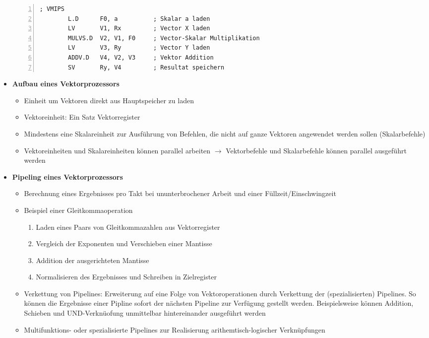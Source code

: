 \begin{itemize}
\begin{minipage}{\linewidth}
\begin{lstlisting}[frame=single,numbers=left,mathescape,language={[mips]Assembler},tabsize=4]
; VMIPS
		L.D      F0, a       	; Skalar a laden
		LV       V1, Rx      	; Vector X laden
		MULVS.D  V2, V1, F0  	; Vector-Skalar Multiplikation
		LV       V3, Ry      	; Vector Y laden
		ADDV.D   V4, V2, V3  	; Vektor Addition
		SV       Ry, V4      	; Resultat speichern
	\end{lstlisting}
	\end{minipage}
	\item \textbf{Aufbau eines Vektorprozessors}
	\begin{itemize}
		\item Einheit um Vektoren direkt aus Hauptspeicher zu laden
		\item Vektoreinheit: Ein Satz Vektorregister
		\item Mindestens eine Skalareinheit zur Ausführung von Befehlen, die nicht auf ganze Vektoren angewendet werden sollen (Skalarbefehle)
		\item Vektoreinheiten und Skalareinheiten können parallel arbeiten \(\rightarrow\) Vektorbefehle und Skalarbefehle können parallel ausgeführt werden
	\end{itemize}
	\item \textbf{Pipeling eines Vektorprozessors}
	\begin{itemize}
		\item Berechnung eines Ergebnisses pro Takt bei ununterbrochener Arbeit und einer Füllzeit/Einschwingzeit
		\item Beispiel einer Gleitkommaoperation
		\begin{enumerate}
			\item Laden eines Paars von Gleitkommazahlen aus Vektorregister
			\item Vergleich der Exponenten und Verschieben einer Mantisse
			\item Addition der ausgerichteten Mantisse
			\item Normalisieren des Ergebnisses und Schreiben in Zielregister
		\end{enumerate}
		\item Verkettung von Pipelines: Erweiterung auf eine Folge von Vektoroperationen durch Verkettung der (spezialisierten) Pipelines. So können die Ergebnisse einer Pipline sofort der nächsten Pipeline zur Verfügung gestellt werden. Beispielsweise können Addition, Schieben und UND-Verknüofung unmittelbar hintereinander ausgeführt werden
		\item Multifunktions- oder spezialisierte Pipelines zur Realisierung arithemtisch-logischer Verknüpfungen
		\begin{itemize}

\end{itemize}
\end{itemize}
\end{itemize}
